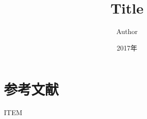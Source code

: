 \documentclass[uplatex,a4paper,11pt]{jsarticle}
\title{Title}
\author{Author}
\date{2017年}
\begin{document}
\setlength{\abovedisplayskip}{-7pt}
\setlength{\belowdisplayskip}{5pt}
\maketitle
%

\section{参考文献}

\vspace{-3zh}
\begin{thebibliography}{99}
 ITEM
\end{thebibliography}
\end{document}
